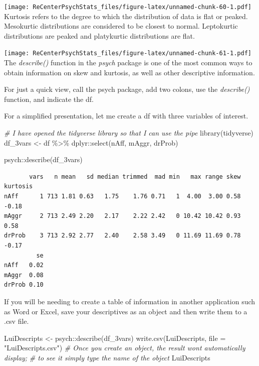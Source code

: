 \documentclass[
  11pt,
]{book}
\newenvironment{Shaded}{\begin{snugshade}}{\end{snugshade}}
\newcommand{\AttributeTok}[1]{\textcolor[rgb]{0.77,0.63,0.00}{#1}}
\newcommand{\CommentTok}[1]{\textcolor[rgb]{0.56,0.35,0.01}{\textit{#1}}}
\newcommand{\FunctionTok}[1]{\textcolor[rgb]{0.00,0.00,0.00}{#1}}
\newcommand{\NormalTok}[1]{#1}
\newcommand{\OtherTok}[1]{\textcolor[rgb]{0.56,0.35,0.01}{#1}}
\newcommand{\SpecialCharTok}[1]{\textcolor[rgb]{0.00,0.00,0.00}{#1}}
\newcommand{\StringTok}[1]{\textcolor[rgb]{0.31,0.60,0.02}{#1}}
\begin{document}
\texttt{[image: ReCenterPsychStats\_files/figure-latex/unnamed-chunk-60-1.pdf]}
Kurtosis refers to the degree to which the distribution of data is flat or peaked. Mesokurtic distributions are considered to be closest to normal. Leptokurtic distributions are peaked and platykurtic distributions are flat.

\texttt{[image: ReCenterPsychStats\_files/figure-latex/unnamed-chunk-61-1.pdf]}
The \emph{describe()} function in the \emph{psych} package is one of the most common ways to obtain information on skew and kurtosis, as well as other descriptive information.

For just a quick view, call the psych package, add two colons, use the \emph{describe()} function, and indicate the df.

For a simplified presentation, let me create a df with three variables of interest.

\begin{Shaded}
\begin{Highlighting}[]
\CommentTok{\# I have opened the tidyverse library so that I can use the pipe}
\FunctionTok{library}\NormalTok{(tidyverse)}
\NormalTok{df\_3vars }\OtherTok{\textless{}{-}}\NormalTok{ df }\SpecialCharTok{\%\textgreater{}\%}
\NormalTok{    dplyr}\SpecialCharTok{::}\FunctionTok{select}\NormalTok{(nAff, mAggr, drProb)}
\end{Highlighting}
\end{Shaded}

\begin{Shaded}
\begin{Highlighting}[]
\NormalTok{psych}\SpecialCharTok{::}\FunctionTok{describe}\NormalTok{(df\_3vars)}
\end{Highlighting}
\end{Shaded}

\begin{verbatim}
       vars   n mean   sd median trimmed  mad min   max range skew kurtosis
nAff      1 713 1.81 0.63   1.75    1.76 0.71   1  4.00  3.00 0.58    -0.18
mAggr     2 713 2.49 2.20   2.17    2.22 2.42   0 10.42 10.42 0.93     0.58
drProb    3 713 2.92 2.77   2.40    2.58 3.49   0 11.69 11.69 0.78    -0.17
         se
nAff   0.02
mAggr  0.08
drProb 0.10
\end{verbatim}

If you will be needing to create a table of information in another application such as Word or Excel, save your descriptives as an object and then write them to a .csv file.

\begin{Shaded}
\begin{Highlighting}[]
\NormalTok{LuiDescripts }\OtherTok{\textless{}{-}}\NormalTok{ psych}\SpecialCharTok{::}\FunctionTok{describe}\NormalTok{(df\_3vars)}
\FunctionTok{write.csv}\NormalTok{(LuiDescripts, }\AttributeTok{file =} \StringTok{"LuiDescripts.csv"}\NormalTok{)}
\CommentTok{\# Once you create an object, the result won\textquotesingle{}t automatically display;}
\CommentTok{\# to see it simply type the name of the object}
\NormalTok{LuiDescripts}
\end{Highlighting}
\end{Shaded}
\end{document}

